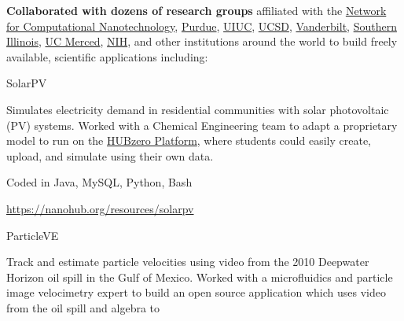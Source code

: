 \documentclass[10pt]{article}
\newcommand\HUBZEROPLATFORM{\href{https://hubzero.org}{HUBzero Platform}}
\begin{document}
\begin{outerlist}
\begin{innerlist}
            \item \textbf{Collaborated with dozens of research groups} affiliated with the
                \href{https://nanohub.org/groups/ncn}{Network for Computational Nanotechnology},
                \href{https://engineering.purdue.edu/ChE/People/ptProfile?id=12436}{Purdue},
                \href{http://nanobionode.illinois.edu}{UIUC},
                \href{http://pegasus.isi.edu}{UCSD},
                \href{http://telab.vuse.vanderbilt.edu/greg.walker}{Vanderbilt},
                \href{http://www.engr.siu.edu/staff1/ahmed/mywebpage/ahmed.html}{Southern Illinois},
                \href{http://faculty1.ucmerced.edu/amartini}{UC Merced},
                \href{http://cbiit.nci.nih.gov/ncip}{NIH},
                and other institutions around the world to build freely available,
                scientific applications including:
                \begin{outerlist}
                    \item[] SolarPV
                        \begin{innerlist}
                            \item[] Simulates electricity demand in residential
                              communities with solar photovoltaic (PV) systems.
                              Worked with a Chemical Engineering team to adapt
                              a proprietary model to run on the \HUBZEROPLATFORM,
                              where students could easily create,
                              upload, and simulate using their own data.
                            \item[] Coded in Java, MySQL, Python, Bash
                            \item[] \url{https://nanohub.org/resources/solarpv} \hfill{}
                        \end{innerlist}
                    \item[] ParticleVE
                        \begin{innerlist}
                            \item[] Track and estimate particle velocities
                              using video from the 2010 Deepwater Horizon
                              oil spill in the Gulf of Mexico. Worked with
                              a microfluidics and particle image velocimetry
                              expert to build an open source application which
                              uses video from the oil spill and algebra to

\end{innerlist}
\end{outerlist}
\end{innerlist}
\end{outerlist}
\end{document}
